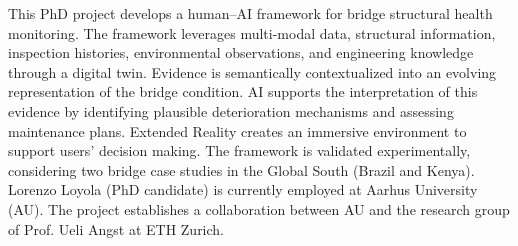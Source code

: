 \documentclass[]{article}
\begin{document}
This PhD project develops a human–AI framework for bridge structural health monitoring. The framework leverages multi-modal data, structural information, inspection histories, environmental observations, and engineering knowledge through a digital twin. Evidence is semantically contextualized into an evolving representation of the bridge condition. AI supports the interpretation of this evidence by identifying plausible deterioration mechanisms and assessing maintenance plans. Extended Reality creates an immersive environment to support users' decision making. The framework is validated experimentally, considering two bridge case studies in the Global South (Brazil and Kenya). Lorenzo Loyola (PhD candidate) is currently employed at Aarhus University (AU). The project establishes a collaboration between AU and the research group of Prof. Ueli Angst at ETH Zurich.
\end{document}
